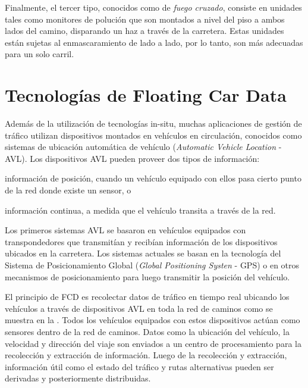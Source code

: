 Finalmente, el tercer tipo, conocidos como de \emph{fuego cruzado}, consiste en unidades tales como monitores de polución que son montados a nivel del piso a ambos lados del camino, disparando un haz a través de la carretera. Estas unidades están sujetas al enmascaramiento de lado a lado, por lo tanto, son más adecuadas para un solo carril.

\section{Tecnologías de Floating Car Data}

Además de la utilización de tecnologías in-situ, muchas aplicaciones de gestión de tráfico utilizan dispositivos montados en vehículos en circulación, conocidos como sistemas de ubicación automática de vehículo (\emph{Automatic Vehicle Location} - AVL). Los dispositivos AVL pueden proveer dos tipos de información: \begin{enumerate*}[a)]
\item información de posición, cuando un vehículo equipado con ellos pasa cierto punto de la red donde existe un sensor, o \item información continua, a medida que el vehículo transita a través de la red.
\end{enumerate*}

Los primeros sistemas AVL se basaron en vehículos equipados con transpondedores que transmitían y recibían información de los dispositivos ubicados en la carretera. Los sistemas actuales se basan en la tecnología del Sistema de Posicionamiento Global (\emph{Global Positioning Systen} - GPS) o en otros mecanismos de posicionamiento para luego transmitir la posición del vehículo.

El principio de FCD es recolectar datos de tráfico en tiempo real ubicando los vehículos a través de dispositivos AVL en toda la red de caminos como se muestra en la . Todos los vehículos equipados con estos dispositivos actúan como sensores dentro de la red de caminos. Datos como la ubicación del vehículo, la velocidad y dirección del viaje son enviados a un centro de procesamiento para la recolección y extracción de información. Luego de la recolección y extracción, información útil como el estado del tráfico y rutas alternativas pueden ser derivadas y posteriormente distribuidas.

